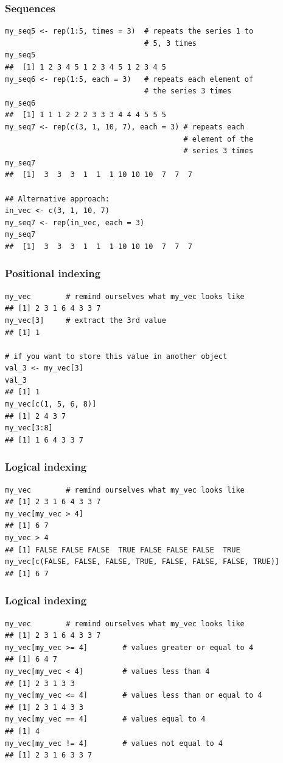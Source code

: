 \documentclass{beamer}
\newcommand{\lsting}[1]{\begin{lstlisting}[basicstyle=#1]}
\newcommand{\bfr}[1]{\begin{frame}[fragile]\frametitle{{ #1 }}}
\begin{document}
\bfr{Sequences}

\lsting{\scriptsize}
my_seq5 <- rep(1:5, times = 3)  # repeats the series 1 to 
                                # 5, 3 times
my_seq5
##  [1] 1 2 3 4 5 1 2 3 4 5 1 2 3 4 5
my_seq6 <- rep(1:5, each = 3)   # repeats each element of 
                                # the series 3 times
my_seq6
##  [1] 1 1 1 2 2 2 3 3 3 4 4 4 5 5 5
my_seq7 <- rep(c(3, 1, 10, 7), each = 3) # repeats each 
                                         # element of the 
                                         # series 3 times
my_seq7
##  [1]  3  3  3  1  1  1 10 10 10  7  7  7

## Alternative approach:
in_vec <- c(3, 1, 10, 7)
my_seq7 <- rep(in_vec, each = 3)   
my_seq7
##  [1]  3  3  3  1  1  1 10 10 10  7  7  7
\end{lstlisting}
\end{frame}


\bfr{Positional indexing}

\lsting{\scriptsize}
my_vec        # remind ourselves what my_vec looks like
## [1] 2 3 1 6 4 3 3 7
my_vec[3]     # extract the 3rd value
## [1] 1

# if you want to store this value in another object
val_3 <- my_vec[3]
val_3
## [1] 1
my_vec[c(1, 5, 6, 8)]
## [1] 2 4 3 7
my_vec[3:8]
## [1] 1 6 4 3 3 7
\end{lstlisting}
\end{frame}


\bfr{Logical indexing}

\lsting{\scriptsize}
my_vec        # remind ourselves what my_vec looks like
## [1] 2 3 1 6 4 3 3 7
my_vec[my_vec > 4]
## [1] 6 7
my_vec > 4
## [1] FALSE FALSE FALSE  TRUE FALSE FALSE FALSE  TRUE
my_vec[c(FALSE, FALSE, FALSE, TRUE, FALSE, FALSE, FALSE, TRUE)]
## [1] 6 7
\end{lstlisting}
\end{frame}

\bfr{Logical indexing}

\lsting{\scriptsize}
my_vec        # remind ourselves what my_vec looks like
## [1] 2 3 1 6 4 3 3 7
my_vec[my_vec >= 4]        # values greater or equal to 4
## [1] 6 4 7
my_vec[my_vec < 4]         # values less than 4
## [1] 2 3 1 3 3
my_vec[my_vec <= 4]        # values less than or equal to 4
## [1] 2 3 1 4 3 3
my_vec[my_vec == 4]        # values equal to 4
## [1] 4
my_vec[my_vec != 4]        # values not equal to 4
## [1] 2 3 1 6 3 3 7
\end{lstlisting}
\end{frame}
\end{document}
